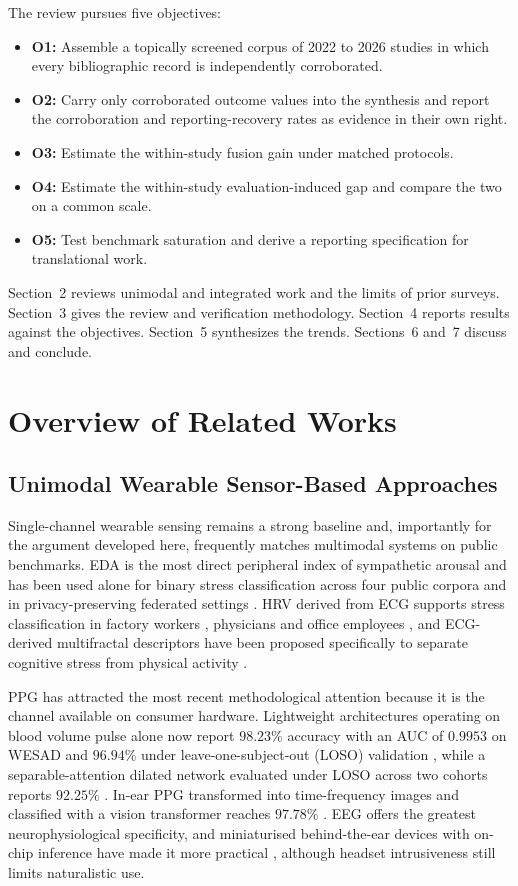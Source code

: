 \documentclass[11pt,a4paper]{article}
\begin{document}
The review pursues five objectives:
\begin{itemize}[leftmargin=1.25em,itemsep=1pt,topsep=2pt]
\item \textbf{O1:} Assemble a topically screened corpus of 2022 to 2026 studies in which every
      bibliographic record is independently corroborated.
\item \textbf{O2:} Carry only corroborated outcome values into the synthesis and report the
      corroboration and reporting-recovery rates as evidence in their own right.
\item \textbf{O3:} Estimate the within-study fusion gain under matched protocols.
\item \textbf{O4:} Estimate the within-study evaluation-induced gap and compare the two on a
      common scale.
\item \textbf{O5:} Test benchmark saturation and derive a reporting specification for
      translational work.
\end{itemize}

Section~2 reviews unimodal and integrated work and the limits of prior surveys. Section~3
gives the review and verification methodology. Section~4 reports results against the
objectives. Section~5 synthesizes the trends. Sections~6 and~7 discuss and conclude.

\section{Overview of Related Works}

\subsection{Unimodal Wearable Sensor-Based Approaches}
Single-channel wearable sensing remains a strong baseline and, importantly for the argument
developed here, frequently matches multimodal systems on public benchmarks. EDA is the most
direct peripheral index of sympathetic arousal and has been used alone for binary stress
classification across four public corpora \cite{r52} and in privacy-preserving federated
settings \cite{r72}. HRV derived from ECG supports stress classification in factory workers
\cite{r5}, physicians \cite{r1} and office employees \cite{r61}, and ECG-derived multifractal
descriptors have been proposed specifically to separate cognitive stress from physical
activity \cite{r56}.

PPG has attracted the most recent methodological attention because it is the channel
available on consumer hardware. Lightweight architectures operating on blood volume pulse
alone now report $98.23\%$ accuracy with an AUC of $0.9953$ on WESAD \cite{r50} and $96.94\%$
under leave-one-subject-out (LOSO) validation \cite{r55}, while a separable-attention dilated
network evaluated under LOSO across two cohorts reports $92.25\%$ \cite{r47}. In-ear PPG
transformed into time-frequency images and classified with a vision transformer reaches
$97.78\%$ \cite{r43}. EEG offers the greatest neurophysiological specificity, and miniaturised
behind-the-ear devices with on-chip inference have made it more practical \cite{r31},
although headset intrusiveness still limits naturalistic use.
\end{document}
